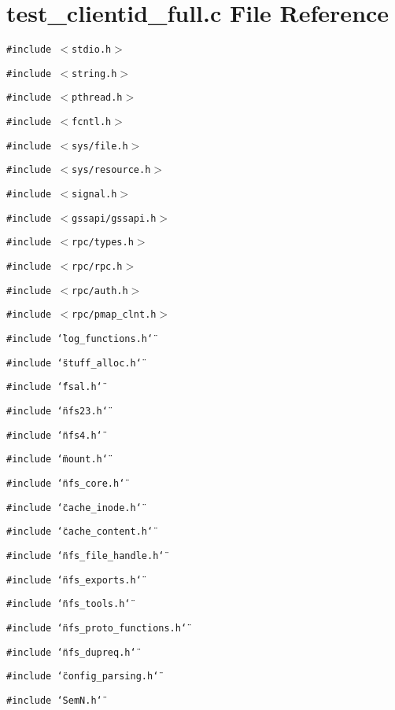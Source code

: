 \section{test\_\-clientid\_\-full.c File Reference}
\label{test__clientid__full_8c}
{\tt \#include $<$stdio.h$>$}\par
{\tt \#include $<$string.h$>$}\par
{\tt \#include $<$pthread.h$>$}\par
{\tt \#include $<$fcntl.h$>$}\par
{\tt \#include $<$sys/file.h$>$}\par
{\tt \#include $<$sys/resource.h$>$}\par
{\tt \#include $<$signal.h$>$}\par
{\tt \#include $<$gssapi/gssapi.h$>$}\par
{\tt \#include $<$rpc/types.h$>$}\par
{\tt \#include $<$rpc/rpc.h$>$}\par
{\tt \#include $<$rpc/auth.h$>$}\par
{\tt \#include $<$rpc/pmap\_\-clnt.h$>$}\par
{\tt \#include \char`\"{}log\_\-functions.h\char`\"{}}\par
{\tt \#include \char`\"{}stuff\_\-alloc.h\char`\"{}}\par
{\tt \#include \char`\"{}fsal.h\char`\"{}}\par
{\tt \#include \char`\"{}nfs23.h\char`\"{}}\par
{\tt \#include \char`\"{}nfs4.h\char`\"{}}\par
{\tt \#include \char`\"{}mount.h\char`\"{}}\par
{\tt \#include \char`\"{}nfs\_\-core.h\char`\"{}}\par
{\tt \#include \char`\"{}cache\_\-inode.h\char`\"{}}\par
{\tt \#include \char`\"{}cache\_\-content.h\char`\"{}}\par
{\tt \#include \char`\"{}nfs\_\-file\_\-handle.h\char`\"{}}\par
{\tt \#include \char`\"{}nfs\_\-exports.h\char`\"{}}\par
{\tt \#include \char`\"{}nfs\_\-tools.h\char`\"{}}\par
{\tt \#include \char`\"{}nfs\_\-proto\_\-functions.h\char`\"{}}\par
{\tt \#include \char`\"{}nfs\_\-dupreq.h\char`\"{}}\par
{\tt \#include \char`\"{}config\_\-parsing.h\char`\"{}}\par
{\tt \#include \char`\"{}Sem\-N.h\char`\"{}}\par
